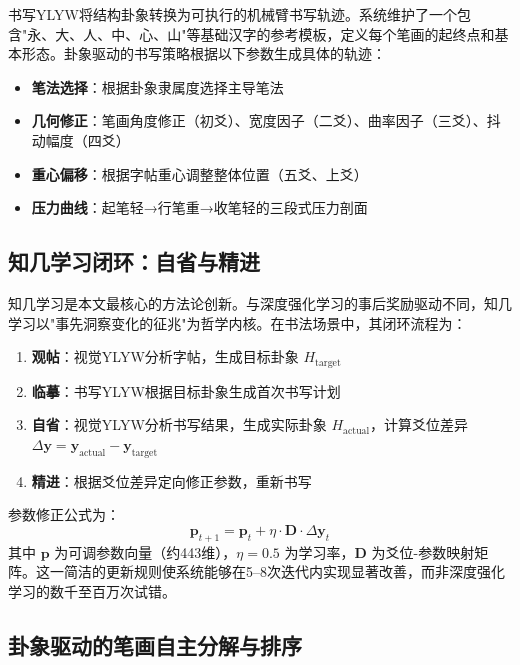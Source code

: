 书写YLYW将结构卦象转换为可执行的机械臂书写轨迹。系统维护了一个包含"永、大、人、中、心、山"等基础汉字的参考模板，定义每个笔画的起终点和基本形态。卦象驱动的书写策略根据以下参数生成具体的轨迹：

\begin{itemize}[nosep]
\item \textbf{笔法选择}：根据卦象隶属度选择主导笔法
\item \textbf{几何修正}：笔画角度修正（初爻）、宽度因子（二爻）、曲率因子（三爻）、抖动幅度（四爻）
\item \textbf{重心偏移}：根据字帖重心调整整体位置（五爻、上爻）
\item \textbf{压力曲线}：起笔轻→行笔重→收笔轻的三段式压力剖面
\end{itemize}

\subsection{知几学习闭环：自省与精进}

知几学习是本文最核心的方法论创新。与深度强化学习的事后奖励驱动不同，知几学习以"事先洞察变化的征兆"为哲学内核。在书法场景中，其闭环流程为：

\begin{enumerate}[nosep]
\item \textbf{观帖}：视觉YLYW分析字帖，生成目标卦象 $H_{\text{target}}$
\item \textbf{临摹}：书写YLYW根据目标卦象生成首次书写计划
\item \textbf{自省}：视觉YLYW分析书写结果，生成实际卦象 $H_{\text{actual}}$，计算爻位差异 $\Delta\mathbf{y} = \mathbf{y}_{\text{actual}} - \mathbf{y}_{\text{target}}$
\item \textbf{精进}：根据爻位差异定向修正参数，重新书写
\end{enumerate}

参数修正公式为：
\begin{equation}
\mathbf{p}_{t+1} = \mathbf{p}_t + \eta \cdot \mathbf{D} \cdot \Delta\mathbf{y}_t
\end{equation}
其中 $\mathbf{p}$ 为可调参数向量（约443维），$\eta=0.5$ 为学习率，$\mathbf{D}$ 为爻位-参数映射矩阵。这一简洁的更新规则使系统能够在5--8次迭代内实现显著改善，而非深度强化学习的数千至百万次试错。

\subsection{卦象驱动的笔画自主分解与排序}

